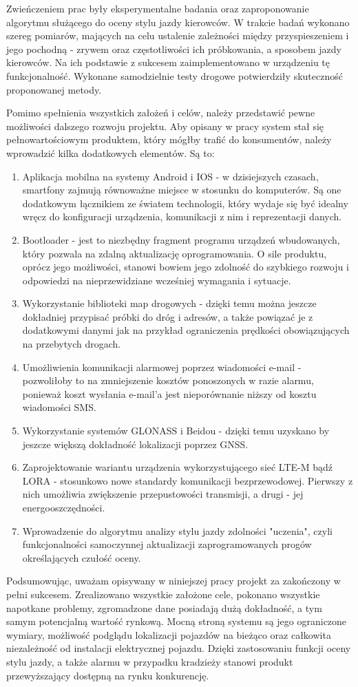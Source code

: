 Zwieńczeniem prac były eksperymentalne badania oraz zaproponowanie algorytmu służącego do oceny stylu jazdy kierowców. W trakcie badań wykonano szereg pomiarów, mających na celu ustalenie zależności między przyspieszeniem i jego pochodną - zrywem oraz częstotliwości ich próbkowania, a sposobem jazdy kierowców. Na ich podstawie z sukcesem zaimplementowano w urządzeniu tę funkcjonalność. Wykonane samodzielnie testy drogowe potwierdziły skuteczność proponowanej metody.

Pomimo spełnienia wszystkich założeń i celów, należy przedstawić pewne możliwości dalszego rozwoju projektu. Aby opisany w pracy system stał się pełnowartościowym produktem, który mógłby trafić do konsumentów, należy wprowadzić kilka dodatkowych elementów. Są to:

\begin{enumerate}
\item Aplikacja mobilna na systemy Android i IOS - w dzisiejszych czasach, smartfony zajmują równoważne miejsce w stosunku do komputerów. Są one dodatkowym łącznikiem ze światem technologii, który wydaje się być idealny wręcz do konfiguracji urządzenia, komunikacji z nim i reprezentacji danych.
\item Bootloader - jest to niezbędny fragment programu urządzeń wbudowanych, który pozwala na zdalną aktualizację oprogramowania. O sile produktu, oprócz jego możliwości, stanowi bowiem jego zdolność do szybkiego rozwoju i odpowiedzi na nieprzewidziane wcześniej wymagania i sytuacje.
\item Wykorzystanie biblioteki map drogowych - dzięki temu można jeszcze dokładniej przypisać próbki do dróg i adresów, a także powiązać je z dodatkowymi danymi jak na przykład ograniczenia prędkości obowiązujących na przebytych drogach.
\item Umożliwienia komunikacji alarmowej poprzez wiadomości e-mail - pozwoliłoby to na zmniejszenie kosztów ponoszonych w razie alarmu, ponieważ koszt wysłania e-mail'a jest nieporównanie niższy od kosztu wiadomości SMS.
\item Wykorzystanie systemów GLONASS i Beidou - dzięki temu uzyskano by jeszcze większą dokładność lokalizacji poprzez GNSS.
\item Zaprojektowanie wariantu urządzenia wykorzystującego sieć LTE-M bądź LORA - stosunkowo nowe standardy komunikacji bezprzewodowej. Pierwszy z nich umożliwia zwiększenie przepustowości transmisji, a drugi - jej energooszczędności.
\item Wprowadzenie do algorytmu analizy stylu jazdy zdolności "uczenia", czyli funkcjonalności samoczynnej aktualizacji zaprogramowanych progów określających czułość oceny.
\end{enumerate} 

Podsumowując, uważam opisywany w niniejszej pracy projekt za zakończony w pełni sukcesem. Zrealizowano wszystkie założone cele, pokonano wszystkie napotkane problemy, zgromadzone dane posiadają dużą dokładność, a tym samym potencjalną wartość rynkową. Mocną stroną systemu są jego ograniczone wymiary, możliwość podglądu lokalizacji pojazdów na bieżąco oraz całkowita niezależność od instalacji elektrycznej pojazdu. Dzięki zastosowaniu funkcji oceny stylu jazdy, a także alarmu w przypadku kradzieży stanowi produkt przewyższający dostępną na rynku konkurencję.